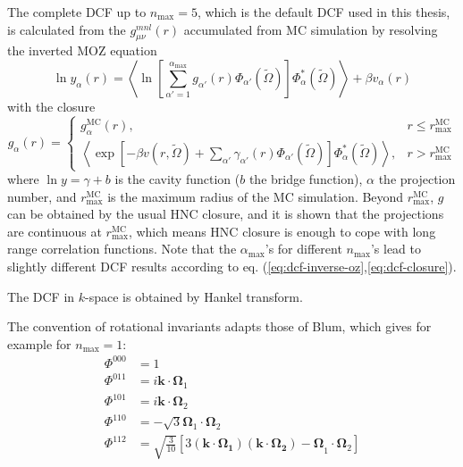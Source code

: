 The complete \acs{DCF} up to $n_{\max}=5$, which is the default
\acs{DCF} used in this thesis, is calculated from the $g_{\mu\nu}^{mnl}(r)$
accumulated from \acs{MC} simulation \citep{puibasset_bridge_2012}
by resolving the inverted \acs{MOZ} equation
\begin{equation}
\ln y_{\alpha}(r)=\left\langle \ln\left[\sum_{\alpha'=1}^{\alpha_{\max}}g_{\alpha'}(r)\Phi_{\alpha'}(\tilde{\Omega})\right]\Phi_{\alpha}^{*}(\tilde{\Omega})\right\rangle +\beta v_{\alpha}(r)\label{eq:dcf-inverse-oz}
\end{equation}
with the closure
\begin{equation}
g_{\alpha}(r)=\begin{cases}
g_{\alpha}^{\mathrm{MC}}(r), & r\leq r_{\max}^{\mathrm{MC}}\\
\left\langle \exp\left[-\beta v(r,\tilde{\Omega})+\sum_{\alpha'}\gamma_{\alpha'}(r)\Phi_{\alpha'}(\tilde{\Omega})\right]\Phi_{\alpha}^{*}(\tilde{\Omega})\right\rangle , & r>r_{\max}^{\mathrm{MC}}
\end{cases}\label{eq:dcf-closure}
\end{equation}
where $\ln y=\gamma+b$ is the cavity function ($b$ the bridge function),
$\alpha$ the projection number, and $r_{\max}^{\mathrm{MC}}$ is
the maximum radius of the \acs{MC} simulation. Beyond $r_{\max}^{\mathrm{MC}}$,
$g$ can be obtained by the usual \acs{HNC} closure, and it is shown
that the projections are continuous at $r_{\max}^{\mathrm{MC}}$,
which means \acs{HNC} closure is enough to cope with long range correlation
functions. Note that the $\alpha_{\max}$'s for different $n_{\max}$'s
lead to slightly different \acs{DCF} results according to eq. (\ref{eq:dcf-inverse-oz},\ref{eq:dcf-closure}). 

The \acs{DCF} in $k$-space is obtained by Hankel transform.

The convention of rotational invariants adapts those of Blum, which
gives for example for $n_{\max}=1$:
\begin{align}
\Phi^{000} & =1\nonumber \\
\Phi^{011} & =i\mathbf{k}\cdot\mathbf{\Omega}_{1}\nonumber \\
\Phi^{101} & =i\mathbf{k}\cdot\mathbf{\Omega}_{2}\nonumber \\
\Phi^{110} & =-\sqrt{3}\mathbf{\Omega}_{1}\cdot\mathbf{\Omega}_{2}\\
\Phi^{112} & =\sqrt{\frac{3}{10}}\left[3\mathbf{(\mathbf{k}\cdot\mathbf{\Omega}_{1})(\mathbf{k}\cdot\mathbf{\Omega}_{2})-\Omega}_{1}\cdot\mathbf{\Omega}_{2}\right]\nonumber 
\end{align}


